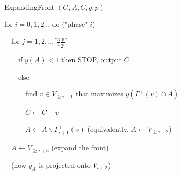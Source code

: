 \begin{algorithm}
\caption{ExpandingFront $(G,A,C,y,p)$}
for $i=0,1,2...$ do ("phase" $i$)

\ \ for $j=1,2,...\lceil \frac{3}{4}\frac{p}{2^i} \rceil$

\ \ \ \ if $y(A) < 1$ then STOP, output $C$

\ \ \ \ else

\ \ \ \ \ \ find $v \in V_{\geq i+1}$ that maximizes $y(\Gamma^+(v)\cap A)$

\ \ \ \ \ \ $C\leftarrow C+v$

\ \ \ \ \ \ $A\leftarrow A \backslash \Gamma^+_{i+1}(v) $ (equivalently, $A\leftarrow V_{\geq i+2}$)

\ \ $A\leftarrow V_{\geq i+3}$ (expand the front)

\ \ (now $y_A$ is projected onto $V_{i+2}$)
\end{algorithm}\\


